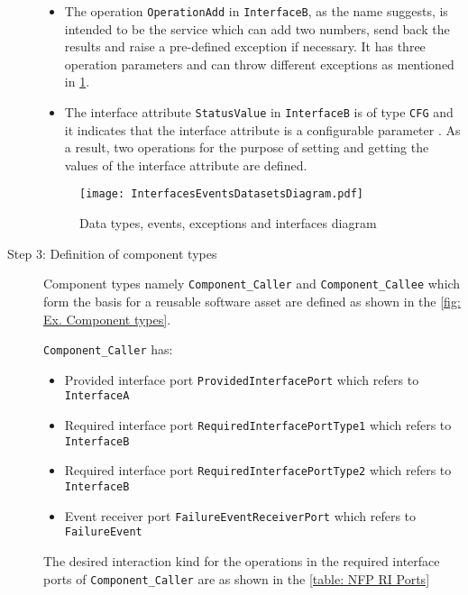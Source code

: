 \begin{description}
\begin{itemize}
\item The operation \texttt{OperationAdd} in \texttt{InterfaceB}, as the name suggests, is intended to be the service which can add two numbers, send back the results and raise a pre-defined exception if necessary. It has three operation parameters and can throw different exceptions as mentioned in \cref{fig: Ex. Datatypes etc.}. 

\item The interface attribute \texttt{StatusValue} in \texttt{InterfaceB} is of type \texttt{CFG} and it indicates that the interface attribute is a configurable parameter \cite{SpecMetamodel}. As a result, two operations for the purpose of setting and getting the values of the interface attribute are defined.      
\end{itemize}

\begin{figure}[h]
	\centering
	\texttt{[image: InterfacesEventsDatasetsDiagram.pdf]}
	\caption{Data types, events, exceptions and interfaces diagram}
	\label{fig: Ex. Datatypes etc.}
\end{figure}

\item [Step 3: Definition of component types] Component types namely \texttt{Component\allowbreak\_Caller} and \texttt{Component\allowbreak\_Callee} which form the basis for a reusable software asset are defined as shown in the \cref{fig: Ex. Component types}. 

\texttt{Component\allowbreak\_Caller} has:
\begin{itemize}
\item Provided interface port \texttt{Provided\allowbreak Interface\allowbreak Port} which refers to \texttt{InterfaceA}
\item Required interface port \texttt{Required\allowbreak Interface\allowbreak PortType1} which refers to \texttt{InterfaceB}
\item Required interface port \texttt{Required\allowbreak Interface\allowbreak PortType2} which refers to \texttt{InterfaceB}
\item Event receiver port \texttt{FailureEvent\allowbreak ReceiverPort} which refers to \texttt{Failure\allowbreak Event}
\end{itemize}

The desired interaction kind for the operations in the required interface ports of \texttt{Component\allowbreak\_Caller} are as shown in the \cref{table: NFP RI Ports}


\end{description}

